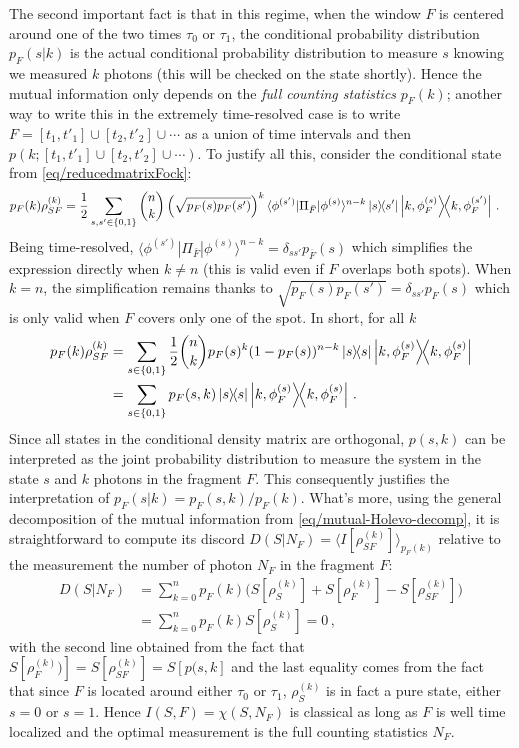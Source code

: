 The second important fact is that in this regime, when the window $F$ is
centered around one of the two times $\tau_0$ or $\tau_1$, the conditional
probability distribution $p_F(s|k)$ is the actual conditional
probability distribution to measure $s$ knowing we measured $k$
photons (this will be checked on the state shortly). Hence the mutual
information only depends on the \emph{full counting statistics}
$p_F(k)$; another way to write this in the extremely time-resolved
case is to write $F = [t_1,t'_1] \cup [t_2,t'_2] \cup \cdots$ as a union 
of time intervals and then $p(k ; [t_1,t'_1] \cup [t_2,t'_2] \cup \cdots)$.
To justify all this, consider the conditional state from 
\cref{eq/reducedmatrixFock}: 
%
\begin{align}
p_F(k)\rho_{SF}^{(k)} &= \frac{1}{2}\sum_{s,s' \in\lbrace 0,1 \rbrace} \binom{n}{k}
	\left(\sqrt{p_F(s)p_F(s')}\right)^k 
		\langle \phi^{(s')} | \Pi_{\bar{F}} | \phi^{(s)} \rangle^{n-k}
	\ketbra{s}{s'}
	\ketbra{k,\phi^{(s)}_F}{k,\phi^{(s')}_F}
\,.
\end{align}
Being time-resolved, $\langle \phi^{(s')} | \Pi_{\bar{F}} | \phi^{(s)} \rangle^{n-k}= 
\delta_{ss'}p_{\overline{F}}(s)$ which
simplifies the expression directly when $k\ne n$ (this is valid even if
$F$ overlaps both spots). When $k=n$,  the simplification
remains thanks to $\sqrt{p_F(s) p_F(s')} = \delta_{ss'}p_F(s)$ which is
only valid when $F$ covers only one of the spot. In short, for all $k$
%
\begin{subequations}
\begin{align}
p_F(k) \rho_{SF}^{(k)} &= \sum_{s \in\lbrace 0,1 \rbrace} 
	\frac{1}{2}\binom{n}{k}
	p_F(s)^k  (1-p_F(s))^{n-k}
	\ketbra{s}
	\ketbra{k,\phi^{(s)}_F}
\\
&=
\sum_{s \in\lbrace 0,1 \rbrace} 
	p_F(s,k)
	\ketbra{s}
	\ketbra{k,\phi^{(s)}_F}
\,.
\end{align}
\end{subequations}
Since all states in the conditional density matrix are orthogonal,
$p(s,k)$ can be interpreted as the joint probability distribution
to measure the system in the state $s$ and $k$ photons
in the fragment $F$. This consequently justifies the interpretation
of $p_F(s|k) = p_F(s,k)/p_F(k)$. What's more, using the general
decomposition of the mutual information from 
\cref{eq/mutual-Holevo-decomp},
it is straightforward to compute its discord 
$D(S|N_F) = \langle I[\rho^{(k)}_{SF}] \rangle_{p_F(k)}$ relative 
to the measurement the number of photon $N_F$ in the fragment
$F$: 
%
\begin{align}
D(S|N_F) &= \sum_{k=0}^n p_F(k) 
\big( 
	S[\rho_S^{(k)}] + S[\rho_F^{(k)}] - S[\rho_{SF}^{(k)}]
\big) \nonumber \\
&= \sum_{k=0}^n p_F(k) S[\rho_S^{(k)}]
=0
\,,
\end{align}
with the second line obtained from the fact that $S[\rho_F^{(k)})] =
S[\rho_{SF}^{(k)}] = S[p(s,k]$ and the last equality comes from
the fact that since $F$ is located around either $\tau_0$ or
$\tau_1$, $\rho_S^{(k)}$ is in fact a pure state, either $s=0$
or $s=1$. Hence $I(S,F) = \chi(S, N_F)$ is classical as long as 
$F$ is well time localized and the optimal measurement is the
full counting statistics $N_F$.

